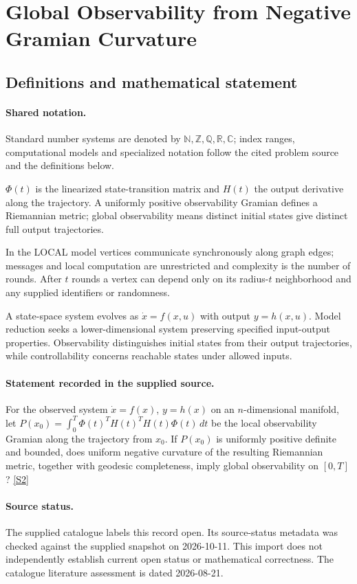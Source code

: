 \documentclass[11pt]{article}
\newcommand{\sref}[2]{\hyperlink{source:#1:#2}{[S#2]}}
\begin{document}
\section{Global Observability from Negative Gramian Curvature}\label{statement}

\subsection{Definitions and mathematical statement}

\paragraph{Shared notation.}Standard number systems are denoted by $\mathbb N,\mathbb Z,\mathbb Q,\mathbb R,\mathbb C$; index ranges, computational models and specialized notation follow the cited problem source and the definitions below.


$\Phi(t)$ is the linearized state-transition matrix and $H(t)$ the output derivative along the trajectory. A uniformly positive observability Gramian defines a Riemannian metric; global observability means distinct initial states give distinct full output trajectories.

In the LOCAL model vertices communicate synchronously along graph edges; messages and local computation are unrestricted and complexity is the number of rounds. After $t$ rounds a vertex can depend only on its radius-$t$ neighborhood and any supplied identifiers or randomness.

A state-space system evolves as $\dot x=f(x,u)$ with output $y=h(x,u)$. Model reduction seeks a lower-dimensional system preserving specified input-output properties. Observability distinguishes initial states from their output trajectories, while controllability concerns reachable states under allowed inputs.
\paragraph{Statement recorded in the supplied source.}
For the observed system $\dot{x}=f(x)$, $y=h(x)$ on an $n$-dimensional manifold, let $P(x_0)=\int_0^T\Phi(t)^TH(t)^TH(t)\Phi(t)\,dt$ be the local observability Gramian along the trajectory from $x_0$. If $P(x_0)$ is uniformly positive definite and bounded, does uniform negative curvature of the resulting Riemannian metric, together with geodesic completeness, imply global observability on $[0,T]$? \sref{statement}{2}
\paragraph{Source status.}
The supplied catalogue labels this record open. Its source-status metadata was checked against the supplied snapshot on 2026-10-11. This import does not independently establish current open status or mathematical correctness. The catalogue literature assessment is dated 2026-08-21.
\end{document}
